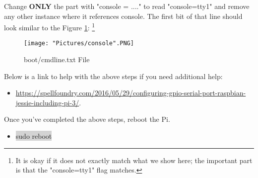 \documentclass[12pt]{article}
\begin{document}
\noindent Change \textbf{ONLY} the part with "console = ...." to read "console=tty1" and remove any other instance where it references console. The first bit of that line should look similar to the Figure \ref{console}: \footnote{It is okay if it does not exactly match what we show here; the important part is that the "console=tty1" flag matches.}

\begin{figure}[H]
 	\centering
	\texttt{[image: "Pictures/console".PNG]}
 	\caption{boot/cmdline.txt File}
	\label{console}
\end{figure}

\noindent Below is a link to help with the above steps if you need additional help:
\begin{itemize}
	\item \href{https://spellfoundry.com/2016/05/29/configuring-gpio-serial-port-raspbian-jessie-including-pi-3/}{https://spellfoundry.com/2016/05/29/configuring-gpio-serial-port-raspbian-jessie-including-pi-3/}. 
\end{itemize}
\noindent Once you've completed the above steps, reboot the Pi.
\begin{itemize}
	\item[] \colorbox{lightgray}{sudo reboot}
\end{itemize}
\end{document}
